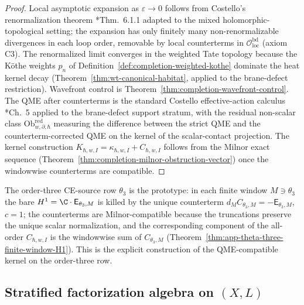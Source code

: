 \begin{proof}
Local asymptotic expansion as \(\varepsilon\to 0\) follows from
Costello's renormalization theorem
\cite{costello-renormalization}*{Thm.~6.1.1} adapted to the mixed
holomorphic-topological setting; the expansion has only finitely
many non-renormalizable divergences in each loop order, removable
by local counterterms in
\(\mathcal O^{\mathrm{bd}}_{\mathrm{loc}}\) (axiom C3).  The
renormalized limit converges in the weighted Tate topology because
the K\"othe weights \(p_n\) of
Definition~\ref{def:completion-weighted-kothe} dominate the heat
kernel decay (Theorem~\ref{thm:wt-canonical-habitat}, applied
to the brane-defect restriction).  Wavefront control is
Theorem~\ref{thm:completion-wavefront-control}.  The QME after
counterterms is the standard Costello effective-action calculus
\cite{costello-renormalization}*{Ch.~5} applied to the brane-defect
support stratum, with the residual non-scalar class
\(\mathrm{Ob}^{\mathrm{red}}_{w,\partial,\hbar}\) measuring
the difference between the strict QME and the
counterterm-corrected QME on the kernel of the scalar-contact
projection.  The kernel construction
\(K_{\hbar,w,I}=\kappa_{\hbar,w,I}+C_{\hbar,w,I}\) follows from the
Milnor exact sequence
(Theorem~\ref{thm:completion-milnor-obstruction-vector}) once the
windowwise counterterms are compatible.
\end{proof}

\begin{rmk}
\label{rmk:completion-theta-three-prototype}
The order-three CE-source row \(\theta_3\) is the prototype: in
each finite window \(M\ni\theta_3\) the bare \(H^1=\C\cdot
\mathsf E_{\theta_3,M}\) is killed by the unique counterterm
\(d_M C_{\theta_3,M}=-\mathsf E_{\theta_3,M}\), \(c=1\); the
counterterms are Milnor-compatible because the truncations
preserve the unique scalar normalization, and the corresponding
component of the all-order \(C_{\hbar,w,I}\) is the windowwise sum
of \(C_{\theta_3,M}\) (Theorem~\ref{thm:app-theta-three-finite-window-H1}).
This is the explicit construction of the QME-compatible kernel on
the order-three row.
\end{rmk}

\subsection{\texorpdfstring{Stratified factorization algebra on \((X,L)\)}{Stratified factorization algebra on (X,L)}}
\label{ssec:completion-stratified-factorization}

